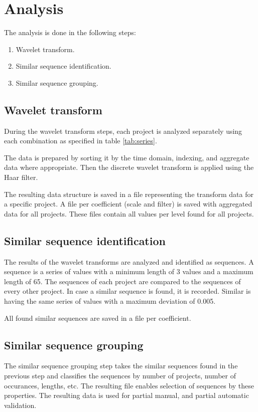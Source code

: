 \section{Analysis}
The analysis is done in the following steps:
\begin{enumerate}
	\item Wavelet transform.
	\item Similar sequence identification.
	\item Similar sequence grouping.
\end{enumerate}

\subsection{Wavelet transform}
During the wavelet transform steps, each project is analyzed separately using
each combination as specified in table \ref{tab:series}.

The data is prepared by sorting it by the time domain, indexing, and aggregate
data where appropriate. Then the discrete wavelet transform is applied using the
Haar filter.

The resulting data structure is saved in a file representing the transform data
for a specific project. A file per coefficient (scale and filter) is saved
with aggregated data for all projects. These files contain all values per level
found for all projects.

\subsection{Similar sequence identification}
The results of the wavelet transforms are analyzed and identified as sequences.
A sequence is a series of values with a minimum length of 3 values and a maximum
length of 65. The sequences of each project are compared to the sequences of
every other project. In case a similar sequence is found, it is recorded.
Similar is having the same series of values with a maximum deviation of
0.005.

All found similar sequences are saved in a file per coefficient.

\subsection{Similar sequence grouping}
The similar sequence grouping step takes the similar sequences found in the
previous step and classifies the sequences by number of projects, number of
occurances, lengths, etc. The resulting file enables selection of sequences by
these properties. The resulting data is used for partial manual, and partial
automatic validation.

